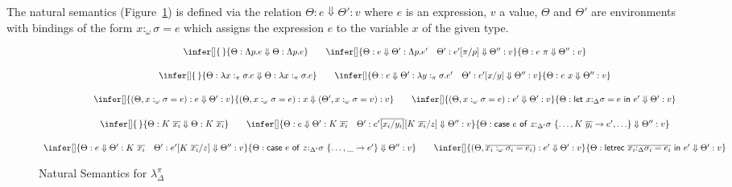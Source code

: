 \documentclass[acmsmall,review,screen]{acmart}
\newcommand{\llet}[2]{\mathsf{let}~#1~\mathsf{in}~#2}
\newcommand{\lletrec}[2]{\mathsf{letrec}~#1~\mathsf{in}~#2}
\newcommand{\ccase}[2]{\mathsf{case}~#1~\mathsf{of}~#2}
\begin{document}
  
The natural semantics (Figure~\ref{fig:natsemapp}) is defined via the relation
$\Theta : e \Downarrow \Theta' : v$ where $e$ is an expression, $v$ a
value, $\Theta$ and $\Theta'$ are environments with bindings of the
form $x:_\omega\sigma = e$ which assigns the expression $e$ to the
variable $x$ of the given type.

\begin{figure}
\[
  \begin{array}{c}
    \infer[]
    {\,}
    {\Theta : \Lambda p.e \Downarrow \Theta : \Lambda p.e}
    \qquad
    \infer[]
    {\Theta  : e\Downarrow \Theta' : \Lambda p.e' \quad \Theta' :
    e'[\pi/p]\Downarrow \Theta'' : v}
    {\Theta : e~\pi\Downarrow \Theta'' : v }\\[1.5em]
    \infer[]
    {\,}
    {\Theta : \lambda x:_\pi \sigma . e \Downarrow \Theta : \lambda x:_\pi \sigma . e }
    \qquad
    \infer[]
    {\Theta : e \Downarrow \Theta' : \lambda y:_\pi \sigma . e' \quad
    \Theta' : e'[x/y] \Downarrow \Theta'' : v }
    {\Theta : e~x \Downarrow \Theta'' : v}\\[1.5em]
    \infer[]
    {(\Theta , x:_\omega \sigma = e): e \Downarrow \Theta' : v}
    {(\Theta , x:_\omega \sigma = e) : x \Downarrow (\Theta',x:_\omega
    \sigma = v) : v}
    \qquad
    \infer[]
    {(\Theta,x:_\omega \sigma = e) : e' \Downarrow \Theta' : v}
    {\Theta : \llet{x{:}_{\Delta}\sigma = e}{e'}\Downarrow \Theta' : v
    }\\[1.5em]
    \infer[]
    {\,}
    {\Theta : K~\ov{x_i} \Downarrow \Theta : K~\ov{x_i}}
    \qquad
    \infer[]
    {\Theta : e \Downarrow \Theta' : K~\ov{x_i} \quad
    \Theta' : e'\ov{[x_i/y_i]}[K~\ov{x_i}/z] \Downarrow \Theta'' : v }
    {\Theta :
    \ccase{e}{z{:}_{\Delta'}\sigma~\{{\dots,K~\ov{y_i} \to e', {\dots}}\}}
    \Downarrow \Theta'' : v}\\[1.5em]
    \infer[]
    {\Theta : e \Downarrow \Theta' : K~\ov{x_i} \quad
    \Theta' : e'[K~\ov{x_i}/z] \Downarrow \Theta'' : v }
    {\Theta :
    \ccase{e}{z{:}_{\Delta'}\sigma~\{\dots , \_\to
    e'}\} \Downarrow \Theta'' : v}
    \qquad
    \infer[]
    {%
    (\Theta, \overline{x_i:_\omega \sigma_i = e_i}) : e' \Downarrow \Theta'
    : v
    }
    {\Theta : \lletrec{\overline{x_i{:}_{\Delta}\sigma_i = e_i}}{e'}
    \Downarrow \Theta' : v}
    \end{array}
  \]
  \caption{Natural Semantics for $\lambda_\Delta^\pi$\label{fig:natsemapp}}
\end{figure}
\end{document}
